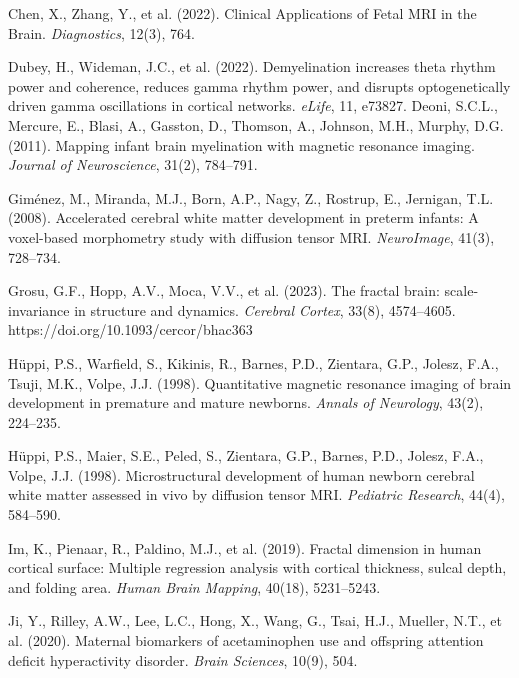 \documentclass[11pt]{article}
\begin{document}
\begin{thebibliography}{99}
Chen, X., Zhang, Y., et al. (2022).
Clinical Applications of Fetal MRI in the Brain.
\textit{Diagnostics}, 12(3), 764.

Dubey, H., Wideman, J.C., et al. (2022).
Demyelination increases theta rhythm power and coherence, reduces gamma rhythm power, and disrupts optogenetically driven gamma oscillations in cortical networks.
\textit{eLife}, 11, e73827.
Deoni, S.C.L., Mercure, E., Blasi, A., Gasston, D., Thomson, A., Johnson, M.H., Murphy, D.G. (2011).
Mapping infant brain myelination with magnetic resonance imaging.
\textit{Journal of Neuroscience}, 31(2), 784--791.

Gim{\'e}nez, M., Miranda, M.J., Born, A.P., Nagy, Z., Rostrup, E., Jernigan, T.L. (2008).
Accelerated cerebral white matter development in preterm infants: A voxel-based morphometry study with diffusion tensor MRI.
\textit{NeuroImage}, 41(3), 728--734.

Grosu, G.F., Hopp, A.V., Moca, V.V., et al. (2023).
The fractal brain: scale-invariance in structure and dynamics.
\textit{Cerebral Cortex}, 33(8), 4574--4605.
https://doi.org/10.1093/cercor/bhac363

H{\"u}ppi, P.S., Warfield, S., Kikinis, R., Barnes, P.D., Zientara, G.P., Jolesz, F.A., Tsuji, M.K., Volpe, J.J. (1998).
Quantitative magnetic resonance imaging of brain development in premature and mature newborns.
\textit{Annals of Neurology}, 43(2), 224--235.

H{\"u}ppi, P.S., Maier, S.E., Peled, S., Zientara, G.P., Barnes, P.D., Jolesz, F.A., Volpe, J.J. (1998).
Microstructural development of human newborn cerebral white matter assessed in vivo by diffusion tensor MRI.
\textit{Pediatric Research}, 44(4), 584--590.

Im, K., Pienaar, R., Paldino, M.J., et al. (2019).
Fractal dimension in human cortical surface: Multiple regression analysis with cortical thickness, sulcal depth, and folding area.
\textit{Human Brain Mapping}, 40(18), 5231--5243.

Ji, Y., Rilley, A.W., Lee, L.C., Hong, X., Wang, G., Tsai, H.J., Mueller, N.T., et al. (2020).
Maternal biomarkers of acetaminophen use and offspring attention deficit hyperactivity disorder.
\textit{Brain Sciences}, 10(9), 504.


\end{thebibliography}
\end{document}
